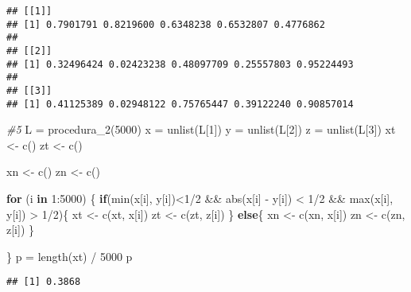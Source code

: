 \documentclass[
]{article}
\newenvironment{Shaded}{\begin{snugshade}}{\end{snugshade}}
\newcommand{\CommentTok}[1]{\textcolor[rgb]{0.56,0.35,0.01}{\textit{#1}}}
\newcommand{\ControlFlowTok}[1]{\textcolor[rgb]{0.13,0.29,0.53}{\textbf{#1}}}
\newcommand{\DecValTok}[1]{\textcolor[rgb]{0.00,0.00,0.81}{#1}}
\newcommand{\FunctionTok}[1]{\textcolor[rgb]{0.00,0.00,0.00}{#1}}
\newcommand{\NormalTok}[1]{#1}
\newcommand{\OtherTok}[1]{\textcolor[rgb]{0.56,0.35,0.01}{#1}}
\newcommand{\SpecialCharTok}[1]{\textcolor[rgb]{0.00,0.00,0.00}{#1}}
\begin{document}
\begin{verbatim}
## [[1]]
## [1] 0.7901791 0.8219600 0.6348238 0.6532807 0.4776862
## 
## [[2]]
## [1] 0.32496424 0.02423238 0.48097709 0.25557803 0.95224493
## 
## [[3]]
## [1] 0.41125389 0.02948122 0.75765447 0.39122240 0.90857014
\end{verbatim}

\begin{Shaded}
\begin{Highlighting}[]
\CommentTok{\#5}
\NormalTok{L }\OtherTok{=} \FunctionTok{procedura\_2}\NormalTok{(}\DecValTok{5000}\NormalTok{)}
\NormalTok{x }\OtherTok{=} \FunctionTok{unlist}\NormalTok{(L[}\DecValTok{1}\NormalTok{])}
\NormalTok{y }\OtherTok{=} \FunctionTok{unlist}\NormalTok{(L[}\DecValTok{2}\NormalTok{])}
\NormalTok{z }\OtherTok{=} \FunctionTok{unlist}\NormalTok{(L[}\DecValTok{3}\NormalTok{])}
\NormalTok{xt }\OtherTok{\textless{}{-}} \FunctionTok{c}\NormalTok{()}
\NormalTok{zt }\OtherTok{\textless{}{-}} \FunctionTok{c}\NormalTok{()}

\NormalTok{xn }\OtherTok{\textless{}{-}} \FunctionTok{c}\NormalTok{()}
\NormalTok{zn }\OtherTok{\textless{}{-}} \FunctionTok{c}\NormalTok{()}

\ControlFlowTok{for}\NormalTok{ (i }\ControlFlowTok{in} \DecValTok{1}\SpecialCharTok{:}\DecValTok{5000}\NormalTok{)}
\NormalTok{\{}
  \ControlFlowTok{if}\NormalTok{(}\FunctionTok{min}\NormalTok{(x[i], y[i])}\SpecialCharTok{\textless{}}\DecValTok{1}\SpecialCharTok{/}\DecValTok{2} \SpecialCharTok{\&\&} \FunctionTok{abs}\NormalTok{(x[i] }\SpecialCharTok{{-}}\NormalTok{ y[i]) }\SpecialCharTok{\textless{}} \DecValTok{1}\SpecialCharTok{/}\DecValTok{2} \SpecialCharTok{\&\&} \FunctionTok{max}\NormalTok{(x[i], y[i]) }\SpecialCharTok{\textgreater{}} \DecValTok{1}\SpecialCharTok{/}\DecValTok{2}\NormalTok{)\{}
\NormalTok{    xt }\OtherTok{\textless{}{-}} \FunctionTok{c}\NormalTok{(xt, x[i])}
\NormalTok{    zt }\OtherTok{\textless{}{-}} \FunctionTok{c}\NormalTok{(zt, z[i])}
\NormalTok{  \}}
  \ControlFlowTok{else}\NormalTok{\{}
\NormalTok{    xn }\OtherTok{\textless{}{-}} \FunctionTok{c}\NormalTok{(xn, x[i])}
\NormalTok{    zn }\OtherTok{\textless{}{-}} \FunctionTok{c}\NormalTok{(zn, z[i])}
\NormalTok{  \}}

\NormalTok{\}}
\NormalTok{p }\OtherTok{=} \FunctionTok{length}\NormalTok{(xt) }\SpecialCharTok{/} \DecValTok{5000}
\NormalTok{p}
\end{Highlighting}
\end{Shaded}

\begin{verbatim}
## [1] 0.3868
\end{verbatim}
\end{document}

